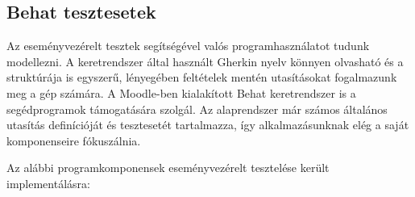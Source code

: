 \subsection{Behat tesztesetek}

Az eseményvezérelt tesztek segítségével valós programhasználatot tudunk modellezni. A keretrendszer által használt Gherkin nyelv könnyen olvasható és a struktúrája is egyszerű, lényegében feltételek mentén utasításokat fogalmazunk meg a gép számára. A Moodle-ben kialakított Behat keretrendszer is a segédprogramok támogatására szolgál. Az alaprendszer már számos általános utasítás definícióját és tesztesetét tartalmazza, így alkalmazásunknak elég a saját komponenseire fókuszálnia.

Az alábbi programkomponensek eseményvezérelt tesztelése került implementálásra:

